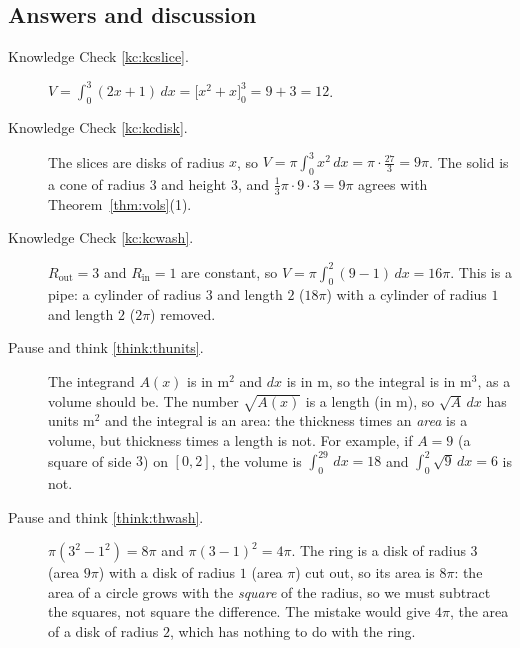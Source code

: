 \documentclass[11pt]{article}
\begin{document}
\subsection*{Answers and discussion}

\begin{description}

  \item[Knowledge Check \ref{kc:kcslice}.] $V=\int_0^3(2x+1)\,dx=\bigl[x^2+x\bigr]_0^3=9+3=12$.

  \item[Knowledge Check \ref{kc:kcdisk}.] The slices are disks of radius $x$, so $V=\pi\int_0^3x^2\,dx=\pi\cdot\frac{27}3=9\pi$. The solid is a cone of radius $3$ and height $3$, and $\frac13\pi\cdot9\cdot3=9\pi$ agrees with Theorem~\ref{thm:vols}(1).

  \item[Knowledge Check \ref{kc:kcwash}.] $R_{\mathrm{out}}=3$ and $R_{\mathrm{in}}=1$ are constant, so $V=\pi\int_0^2(9-1)\,dx=16\pi$. This is a pipe: a cylinder of radius $3$ and length $2$ ($18\pi$) with a cylinder of radius $1$ and length $2$ ($2\pi$) removed.

  \item[Pause and think \ref{think:thunits}.] The integrand $A(x)$ is in $\mathrm{m}^2$ and $dx$ is in $\mathrm{m}$, so the integral is in $\mathrm{m}^3$, as a volume should be. The number $\sqrt{A(x)}$ is a length (in $\mathrm{m}$), so $\sqrt A\,dx$ has units $\mathrm{m}^2$ and the integral is an area: the thickness times an \emph{area} is a volume, but thickness times a length is not. For example, if $A=9$ (a square of side $3$) on $[0,2]$, the volume is $\int_0^29\,dx=18$ and $\int_0^2\sqrt9\,dx=6$ is not.

  \item[Pause and think \ref{think:thwash}.] $\pi(3^2-1^2)=8\pi$ and $\pi(3-1)^2=4\pi$. The ring is a disk of radius $3$ (area $9\pi$) with a disk of radius $1$ (area $\pi$) cut out, so its area is $8\pi$: the area of a circle grows with the \emph{square} of the radius, so we must subtract the squares, not square the difference. The mistake would give $4\pi$, the area of a disk of radius $2$, which has nothing to do with the ring.


\end{description}
\end{document}
